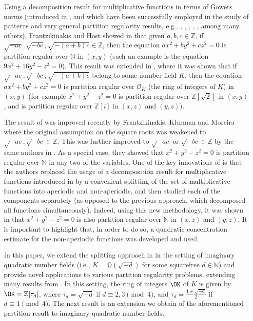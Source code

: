 \documentclass[11pt]{amsart}
\theoremstyle{definition}
\newcommand{\N}{{\mathbb N}}
\newcommand{\Q}{{\mathbb Q}}
\newcommand{\Z}{{\mathbb Z}}
\newcommand{\FM}[1]{{\color{violet}{{#1}}}}
\newcommand{\SD}[1]{{\color{green!60!black}{{#1}}}}
\newcommand{\AK}[1]{{\color{ForestGreen}{{#1}}}}
\begin{document}
Using a decomposition result for multiplicative functions in terms of Gowers norms (introduced in \cite{Go01}, and which have been successfully employed in the study of patterns and very general partition regularity results, e.g., \cite{GT08b}, \cite{BMR20}, \cite{Fr21}, \cite{Fr22}, \cite{FHo17}, among many others), Frantzikinakis and Host showed in \cite{FHo17} that given $a,b,c\in\Z$, if $\sqrt{-ac}, \sqrt{-bc}, \sqrt{-(a+b)c}\in\Z$, then the equation $ax^{2}+by^{2}+cz^{2}=0$ is partition regular over $\N$ in $(x,y)$ (such an example is the equation $9x^{2}+16y^{2}-z^{2}=0$). 
This result was extended in \cite{S18, S23}, where it was shown that if $\sqrt{-ac}, \sqrt{-bc}, \sqrt{-(a+b)c}$ belong to some number field $K$, then
the equation $ax^{2}+by^{2}+cz^{2}=0$ is partition regular over $\mathcal{O}_{K}$ (the ring of integers of $K$) in $(x,y)$  (for example $x^{2}+y^{2}-z^{2}=0$ is partition regular over $\Z[\sqrt{2}]$ in $(x,y)$, and is partition regular over $\Z[i]$ in $(x,z)$ and $(y,z)$).

The result of \cite{FHo17} was improved recently by Frantzikinakis, Klurman and Moreira \cite{FKM1} where the original assumption on the square roots was weakened to $\sqrt{-ac}, \sqrt{-bc}\in\Z$. This was further improved to $\sqrt{-ac}$ or $\sqrt{-bc}\in\Z$ by the same authors in \cite{FKM2}. As a special case, they showed that $x^{2}+y^{2}-z^{2}=0$ is partition regular over $\N$ in any two of the variables. One of the key innovations of \cite{FKM2,FKM1} is that the authors replaced the usage of a decomposition result for multiplicative functions introduced in \cite{FHo17} by a convenient splitting of the set of multiplicative functions into aperiodic and non-aperiodic, and then studied each of the components separately (as opposed to the previous approach, which decomposed all functions simultaneously).
Indeed, using this new methodology, it was shown in \cite{FKM1} that $x^{2}+y^{2}-z^{2}=0$ is also partition regular over $\N$ in $(x,z)$ and $(y,z)$. It is important to highlight that, in order to do so, a quadratic concentration estimate for the non-aperiodic functions was developed and used. %



In this paper, we extend the splitting approach in \cite{FKM2,FKM1} in the setting of imaginary quadratic number fields (i.e., $K=\Q(\sqrt{-d})$ for some squarefree $d\in\N$) and  provide novel applications to various partition regularity problems, extending many results from \cite{FHo17,FKM2,FKM1,S18,S23}. 
  In this setting, the ring of integers $\OK$ of $K$ is given by $\OK=\Z[\tau_{d}]$, where $\tau_{d}=\sqrt{-d}$ if $d \equiv 2,3 \pmod 4$, and $\tau_d=\frac{1+\sqrt{-d}}{2}$ if $d \equiv 1 \pmod 4$.
  The next result is an extension we obtain of the aforementioned partition result \cite[Corollary~1.3]{FKM1} to imaginary quadratic number fields.
\end{document}
